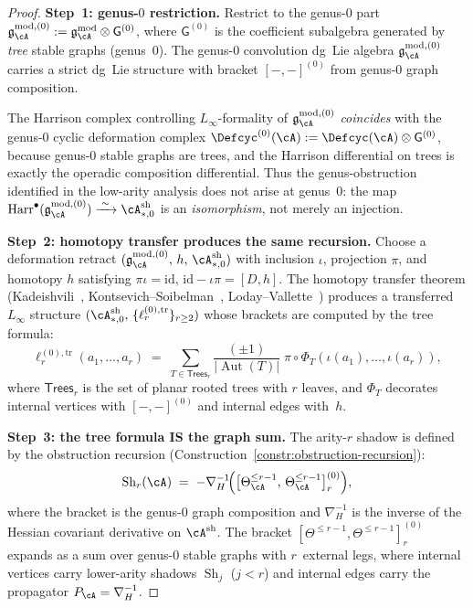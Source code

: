\begin{theorem}
\begin{proof}
\medskip\noindent
\textbf{Step~1: genus-$0$ restriction.}
Restrict to the genus-$0$ part
$\mathfrak{g}_{\cA}^{\mathrm{mod},(0)} := \mathfrak{g}_{\cA}^{\mathrm{mod}} \otimes \mathsf{G}^{(0)}$,
where $\mathsf{G}^{(0)}$ is the coefficient subalgebra
generated by \emph{tree} stable graphs (genus~$0$).  The
genus-$0$ convolution dg~Lie algebra $\mathfrak{g}_{\cA}^{\mathrm{mod},(0)}$
carries a strict dg~Lie structure with bracket
$[-,-]^{(0)}$ from genus-$0$ graph composition.

The Harrison complex controlling $L_\infty$-formality of
$\mathfrak{g}_{\cA}^{\mathrm{mod},(0)}$ \emph{coincides} with the genus-$0$
cyclic deformation complex
$\Defcyc^{(0)}(\cA) := \Defcyc(\cA) \otimes
\mathsf{G}^{(0)}$, because genus-$0$ stable graphs are
trees, and the Harrison differential on trees is
exactly the operadic composition differential.
Thus the genus-obstruction identified in the
low-arity analysis does not arise at genus~$0$:
the map
$\operatorname{Harr}^\bullet(\mathfrak{g}_{\cA}^{\mathrm{mod},(0)})
\xrightarrow{\;\sim\;}
\cA^{\mathrm{sh}}_{*,0}$
is an \emph{isomorphism}, not merely an injection.

\medskip\noindent
\textbf{Step~2: homotopy transfer produces the same
recursion.}
Choose a deformation retract
$(\mathfrak{g}_{\cA}^{\mathrm{mod},(0)},\, h,\, \cA^{\mathrm{sh}}_{*,0})$
with inclusion $\iota$, projection $\pi$, and homotopy
$h$ satisfying $\pi\iota = \mathrm{id}$,
$\mathrm{id} - \iota\pi = [D, h]$.
The homotopy transfer theorem
(Kadeishvili~\cite{Kadeishvili80},
Kontsevich--Soibelman~\cite{KS00},
Loday--Vallette~\cite{LV12})
produces a transferred $L_\infty$ structure
$(\cA^{\mathrm{sh}}_{*,0},\,
\{\ell_r^{(0),\mathrm{tr}}\}_{r \geq 2})$
whose brackets are computed by the tree formula:
\begin{equation}\label{eq:tree-formula-general}
\ell_r^{(0),\mathrm{tr}}(a_1, \ldots, a_r)
\;=\;
\sum_{T \in \mathsf{Trees}_r}
\frac{(\pm 1)}{|\operatorname{Aut}(T)|}
\;\pi \circ
\Phi_T(\iota(a_1), \ldots, \iota(a_r)),
\end{equation}
where $\mathsf{Trees}_r$ is the set of planar rooted
trees with $r$ leaves, and $\Phi_T$ decorates internal
vertices with $[-,-]^{(0)}$ and internal edges with~$h$.

\medskip\noindent
\textbf{Step~3: the tree formula IS the graph sum.}
The arity-$r$ shadow is defined by the obstruction
recursion (Construction~\ref{constr:obstruction-recursion}):
\[
\operatorname{Sh}_r(\cA)
\;=\;
-\nabla_H^{-1}\!\Bigl(
\bigl[\Theta_\cA^{\leq r-1},\,
\Theta_\cA^{\leq r-1}\bigr]^{(0)}_{r}
\Bigr),
\]
where the bracket is the genus-$0$ graph composition
and $\nabla_H^{-1}$ is the inverse of the Hessian
covariant derivative on $\cA^{\mathrm{sh}}$.
The bracket
$[\Theta^{\leq r-1}, \Theta^{\leq r-1}]^{(0)}_r$
expands as a sum over genus-$0$ stable graphs with
$r$~external legs, where internal vertices carry
lower-arity shadows $\operatorname{Sh}_j$ ($j < r$)
and internal edges carry the propagator
$P_\cA = \nabla_H^{-1}$.


\end{proof}
\end{theorem}
